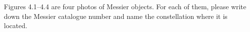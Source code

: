 Figures 4.1--4.4 are four photos of Messier objects. For each of them, please
write down the Messier catalogue number and name the constellation where it is
located.

